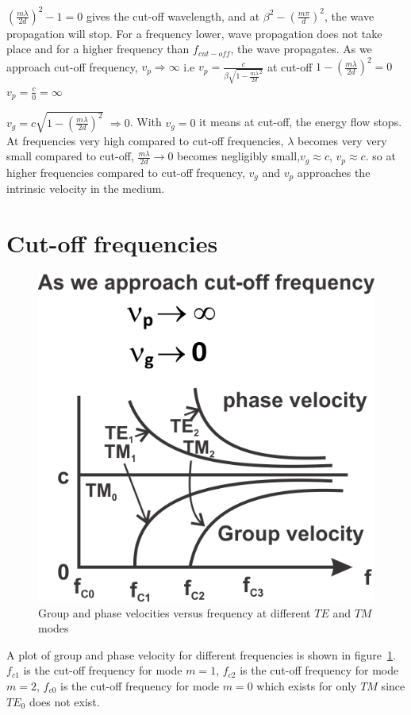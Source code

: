$(\frac{m\lambda}{2d})^{2} -1=0$ gives the cut-off wavelength, and at $\beta^{2} -(\frac{m\pi}{d})^{2}$, the wave propagation will stop. For a frequency lower, wave propagation does not take place and for a higher frequency than $f_{cut-off}$, the wave propagates. As we approach cut-off frequency, $v_{p}\Rightarrow \infty$ i.e $v_{p}= \frac{c}{\beta \sqrt{1- \frac{m \lambda}{2d}^{2}}}$ at cut-off $1 - (\frac{m\lambda}{2d})^{2}=0$ $v_{p} =\frac{c}{0} =\infty$

$v_{g} =c \sqrt{1-(\frac{m\lambda}{2d})^{2}}$ $\Rightarrow 0$. With $v_{g} = 0$ it means at cut-off, the energy flow stops. At frequencies very high compared to cut-off frequencies, $\lambda$ becomes very very small compared to cut-off, $\frac{m\lambda}{2d} \rightarrow 0$ becomes negligibly small,$v_{g} \approx c$, $v_{p} \approx c$. so at higher frequencies compared to cut-off frequency, $v_{g}$ and $v_{p}$ approaches the intrinsic velocity in the medium.

\section{Cut-off frequencies}
\begin{figure}[h]
\centering
\includegraphics[scale=1]{./graphics/silas5}
\caption{Group and phase velocities versus frequency at different $TE$ and $TM$ modes}
\label{fig:silas5}
\end{figure}
A plot of group and phase velocity for different frequencies is shown in figure~\ref{fig:silas5}. $f_{c1}$ is the cut-off frequency for mode $m=1$, $f_{c2}$ is the cut-off frequency for mode $m=2$, $f_{c0}$ is the cut-off frequency for mode $m=0$ which exists for only $TM$ since $TE_0$ does not exist.

